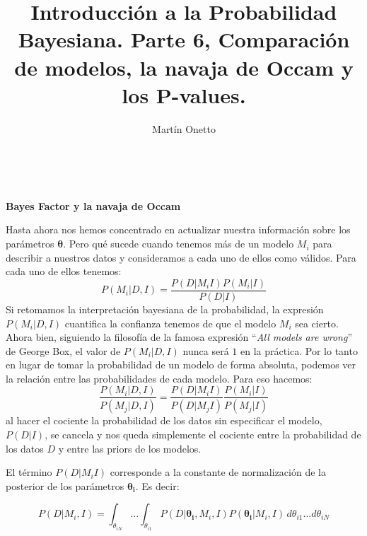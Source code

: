 \documentclass[aps,onecolumn,12pt,notitlepage]{revtex4-2}
\begin{document}
\renewcommand{\andname}{y}
\renewcommand{\tablename}{Tabla}
\renewcommand{\labelenumi}{\Roman{enumi}.}

\title{Introducción a la Probabilidad Bayesiana.  Parte 6, Comparación de modelos, la navaja de Occam y los P-values.}
\author{Martín Onetto} 
\maketitle
\

\textbf{Bayes Factor y la navaja de Occam}

Hasta ahora nos hemos concentrado en actualizar nuestra información sobre los parámetros $\boldsymbol{\theta}$. Pero qué sucede cuando tenemos más de un modelo $M_{i}$ para describir a nuestros datos y consideramos a cada uno de ellos como válidos. Para cada uno de ellos tenemos:
\begin{equation}
P(M_{i}|D,I) = \frac{P(D|M_{i} I) P(M_{i}|I)}{P(D|I)}
\end{equation}
Si retomamos la interpretación bayesiana de la probabilidad, la expresión $P(M_{i}|D,I)$ cuantifica la confianza tenemos de que el modelo $M_{i}$ sea cierto. Ahora bien, siguiendo la filosofía de la famosa expresión ``\textit{All models are wrong}'' de George Box, el valor de $P(M_{i}|D,I)$ nunca será $1$ en la práctica. Por lo tanto en lugar de tomar la probabilidad de un modelo de forma absoluta, podemos ver la relación entre las probabilidades de cada modelo. Para eso hacemos:
\begin{equation}
\frac{P(M_{i}|D,I)}{P(M_{j}|D,I)} = \frac{P(D|M_{i} I)}{P(D|M_{j} I)} \frac{P(M_{i}|I)}{P(M_{j}|I)}
\label{eq:modelos}
\end{equation}
al hacer el cociente la probabilidad de los datos sin especificar el modelo, $P(D|I)$, se cancela y nos queda simplemente el cociente entre la probabilidad de los datos $D$ y entre las priors de los modelos.

El término $P(D|M_{i} I)$ corresponde a la constante de normalización de la posterior de los parámetros $\boldsymbol{\theta_{i}}$. Es decir:

\begin{equation}
P(D|M_{i}, I) = \int_{\theta_{iN}} ... \int_{\theta_{i1}} P(D|\boldsymbol{\theta_{i}},M_{i} ,I) P(\boldsymbol{\theta_{i}}	|M_{i},I)\,  d\theta_{i1} ... d\theta_{iN}
\label{eq:P(D|MI)}
\end{equation}
\end{document}
